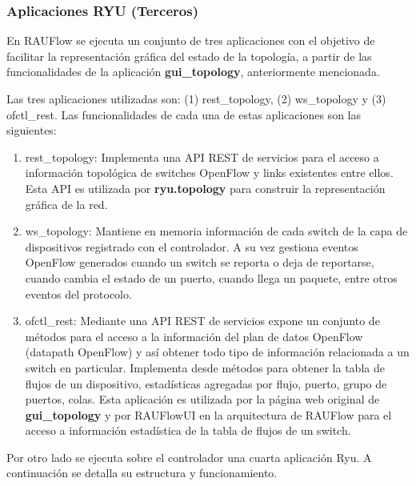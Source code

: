 \subsubsection{Aplicaciones RYU (Terceros)}
En RAUFlow se ejecuta un conjunto de tres aplicaciones con el objetivo de facilitar la representaci\'on gr\'afica del estado de la topolog\'ia, a partir de las funcionalidades de la aplicación \textbf{gui\_topology}, anteriormente mencionada. 

Las tres aplicaciones utilizadas son:
(1) rest\_topology, (2) ws\_topology y (3) ofctl\_rest. Las funcionalidades de cada una de estas aplicaciones son las siguientes:

\begin{enumerate}
\item rest\_topology: Implementa una API REST de servicios para el acceso a informaci\'on topol\'ogica de switches OpenFlow y links existentes entre ellos. Esta API es utilizada por \textbf{ryu.topology} para construir la representaci\'on gr\'afica de la red.

\item ws\_topology: Mantiene en memoria informaci\'on de cada switch de la capa de dispositivos registrado con el controlador. A su vez gestiona eventos OpenFlow generados cuando un switch se reporta o deja de reportarse, cuando cambia el estado de un puerto, cuando llega un paquete, entre otros eventos del protocolo.

\item ofctl\_rest: Mediante una API REST de servicios expone un conjunto de m\'etodos para el acceso a la informaci\'on del plan de datos OpenFlow (datapath OpenFlow) y as\'i obtener todo tipo de informaci\'on relacionada a un switch en particular. Implementa desde m\'etodos para obtener la tabla de flujos de un dispositivo, estadísticas agregadas por flujo, puerto, grupo de puertos, colas. Esta aplicaci\'on es utilizada por la p\'agina web original de \textbf{gui\_topology} y por RAUFlowUI en la arquitectura de RAUFlow para el acceso a informaci\'on estad\'istica de la tabla de flujos de un switch.

\end{enumerate}

Por otro lado se ejecuta sobre el controlador una cuarta aplicaci\'on Ryu. A continuaci\'on se detalla su estructura y funcionamiento.

